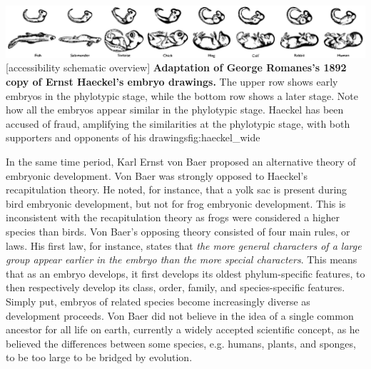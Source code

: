 {\includegraphics[width=2.2\textwidth]
{ch.introduction/imgs/haeckel_wide.png}}
[accessibility schematic overview]
{\textbf{Adaptation of George Romanes's 1892 copy of Ernst Haeckel's embryo drawings.} The upper row shows early embryos in the phylotypic stage, while the bottom row shows a later stage. Note how all the embryos appear similar in the phylotypic stage. Haeckel has been accused of fraud, amplifying the similarities at the phylotypic stage, with both supporters\cite{Richards2008} and opponents of his drawings\cite{Pennisi1997}}{fig:haeckel_wide}

In the same time period, Karl Ernst von Baer proposed an alternative theory of embryonic development. Von Baer was strongly opposed to Haeckel's recapitulation theory. He noted, for instance, that a yolk sac is present during bird embryonic development, but not for frog embryonic development. This is inconsistent with the recapitulation theory as frogs were considered a higher species than birds. Von Baer's opposing theory consisted of four main rules, or laws\cite{baer1828}. His first law, for instance, states that \textit{the more general characters of a large group appear earlier in the embryo than the more special characters}. This means that as an embryo develops, it first develops its oldest phylum-specific features, to then respectively develop its class, order, family, and species-specific features. Simply put, embryos of related species become increasingly diverse as development proceeds. Von Baer did not believe in the idea of a single common ancestor for all life on earth, currently a widely accepted scientific concept, as he believed the differences between some species, e.g. humans, plants, and sponges, to be too large to be bridged by evolution.


